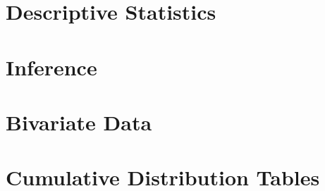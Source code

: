 \documentclass[12pt,twoside]{book}
\begin{document}
\chapter{Descriptive Statistics}

\chapter{Inference}

\chapter{Bivariate Data}



\appendix
\chapter{Cumulative Distribution Tables}

\end{document}

